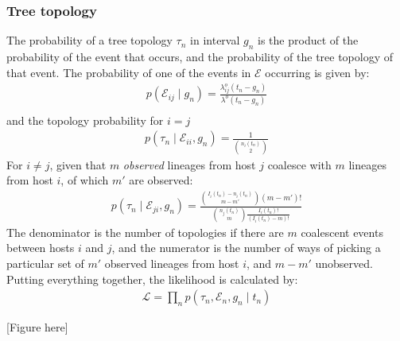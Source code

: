 \documentclass[a4paper,18pt]{report}
\begin{document}
\subsubsection{Tree topology}
The probability of a tree topology $\tau_n$ in interval $g_n$ is the product of the probability of the event that occurs, and the probability of the tree topology of that event.
The probability of one of the events in $\mathcal{E}$ occurring is given by:
\begin{eqnarray}
p(\mathcal{E}_{ij} \mid g_n) = \frac{\lambda_{ij}^o(t_n - g_n)}{\lambda^o(t_n - g_n)}  \nonumber \\
\end{eqnarray}
and the topology probability for  $i=j$
\begin{eqnarray}
p(\tau_n \mid \mathcal{E}_{ii}, g_n) = \frac{1}{{n_i (t_n)\choose 2}} 
\end{eqnarray}
For $i \neq j$, given that $m$ {\it observed} lineages from host $j$ coalesce with $m$ lineages from host $i$, of which $m'$ are observed:
\begin{eqnarray}
p(\tau_n \mid \mathcal{E}_{ji}, g_n) = \frac{ {I_i(t_n) - n_i(t_n) \choose m - m'}(m-m')!}{{n_j (t_n)\choose m} \frac{I_i(t_n)!}{(I_i(t_n) - m)!}} 
\end{eqnarray}
The denominator is the number of topologies if there are $m$ coalescent events between hosts $i$ and $j$, and the numerator is the number of ways of picking a particular set of $m'$ observed lineages from host $i$, and $m-m'$ unobserved. 
Putting everything together, the likelihood is calculated by:
\begin{eqnarray}
\mathcal{L} = \prod_n p(\tau_n, \mathcal{E}_n, g_n \mid t_n)
\end{eqnarray}

[Figure here]
\end{document}
